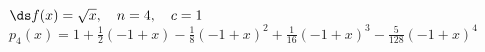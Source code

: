 {$\ds f(x) = \sqrt x, \quad n=4, \quad c=1$
}
{$p_4(x) = 1+\frac{1}{2} (-1+x)-\frac{1}{8} (-1+x)^2+\frac{1}{16}
   (-1+x)^3-\frac{5}{128} (-1+x)^4$
}